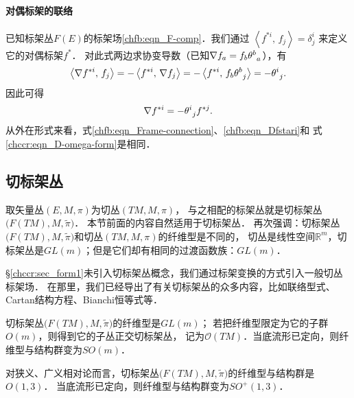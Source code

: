 \paragraph{对偶标架的联络}
已知标架丛$F(E)$的标架场\eqref{chfb:eqn_F-comp}．我们通过
$\left< f^{*i} ,\, f_j\right> =\delta^i_j$
来定义它的对偶标架$f^{*}$．
对此式两边求协变导数（已知$\nabla f_a  =f_b \theta_{\hphantom{a}a}^{b}$），有
\begin{equation}
    \left< \nabla f^{*i} ,\, f_j\right> = - \left< f^{*i} ,\, \nabla f_j\right>
    =- \left< f^{*i} ,\, f_b \theta_{\hphantom{a}j}^{b} \right>
    =- \theta_{\hphantom{j}j}^{i}.
\end{equation} 
因此可得
\begin{equation}\label{chfb:eqn_Dfstari}
    \nabla f^{*i}=- \theta_{\hphantom{j}j}^{i} f^{*j} .
\end{equation}
从外在形式来看，式\eqref{chfb:eqn_Frame-connection}、\eqref{chfb:eqn_Dfstari}和
式\eqref{chccr:eqn_D-omega-form}是相同．








\subsection{切标架丛}\label{chfb:sec_tangent-frame-bundles}

取矢量丛$(E,M,\pi)$为切丛$(TM,M,\pi)$，
与之相配的标架丛就是切标架丛$\bigl(F(TM),M,\tilde{\pi}\bigr)$．
本节前面的内容自然适用于切标架丛．
再次强调：切标架丛$\bigl(F(TM),M,\tilde{\pi}\bigr)$和切丛$(TM,M,\pi)$的纤维型是不同的，
切丛是线性空间$\mathbb{R}^m$，切标架丛是$GL(m)$；但是它们却有相同的过渡函数族：$GL(m)$．



\S\ref{chccr:sec_form1}未引入切标架丛概念，我们通过标架变换的方式引入一般切丛标架场．
在那里，我们已经导出了有关切标架丛的众多内容，比如联络型式、Cartan结构方程、Bianchi恒等式等．

切标架丛$\bigl(F(TM),M,\tilde{\pi}\bigr)$的纤维型是$GL(m)$；
若把纤维型限定为它的子群$O(m)$，则得到它的子丛{\heiti 正交切标架丛}，
记为$\mathcal{O}(TM)$．当底流形已定向，则纤维型与结构群变为$SO(m)$．

对狭义、广义相对论而言，切标架丛$\bigl(F(TM),M,\tilde{\pi}\bigr)$的纤维型与结构群是$O(1,3)$．
当底流形已定向，则纤维型与结构群变为$SO^{+}(1,3)$．



